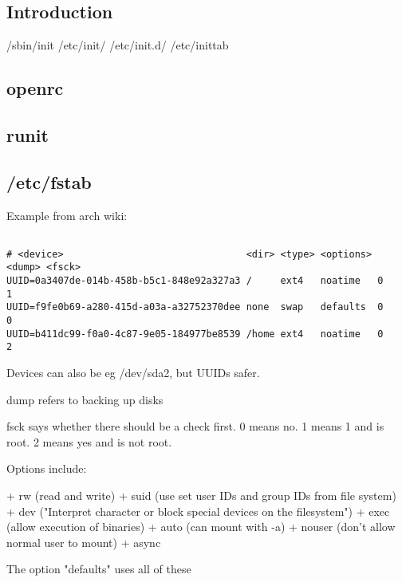
\subsection{Introduction}

/sbin/init
/etc/init/
/etc/init.d/
/etc/inittab



\subsection{openrc}

\subsection{runit}


\subsection{/etc/fstab}

Example from arch wiki:

\begin{verbatim}

# <device>                                <dir> <type> <options> <dump> <fsck>
UUID=0a3407de-014b-458b-b5c1-848e92a327a3 /     ext4   noatime   0      1
UUID=f9fe0b69-a280-415d-a03a-a32752370dee none  swap   defaults  0      0
UUID=b411dc99-f0a0-4c87-9e05-184977be8539 /home ext4   noatime   0      2

\end{verbatim}


Devices can also be eg /dev/sda2, but UUIDs safer.

dump refers to backing up disks

fsck says whether there should be a check first. 0 means no. 1 means 1 and is root. 2 means yes and is not root.

Options include:

+ rw (read and write)
+ suid (use set user IDs and group IDs from file system)
+ dev ("Interpret character or block special devices on the filesystem")
+ exec (allow execution of binaries)
+ auto (can mount with -a)
+ nouser (don't allow normal user to mount)
+ async

The option "defaults" uses all of these

